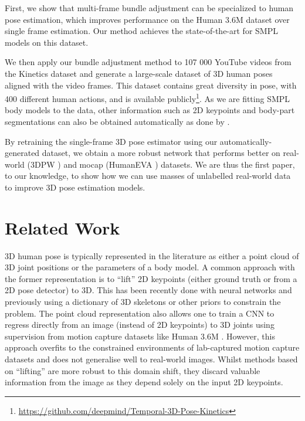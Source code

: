 \documentclass[10pt,twocolumn,letterpaper]{article}
\begin{document}
 
First, we show that multi-frame bundle adjustment can be specialized to
human pose estimation, which improves performance on the Human 3.6M dataset over single frame estimation. 
Our method achieves the state-of-the-art for SMPL \cite{loper_tog_2015} models on this dataset.

We then apply our bundle adjustment method to 107 000 YouTube videos from the Kinetics dataset \cite{kay_arxiv_2017} and generate a large-scale dataset of 3D human poses aligned with the video frames.
This dataset contains great diversity in pose, with 400 different human actions, 
and is available publicly\footnote{\url{https://github.com/deepmind/Temporal-3D-Pose-Kinetics}}.
As we are fitting SMPL body models \cite{loper_tog_2015} to the data, other information such as 2D keypoints and body-part segmentations can also be obtained automatically as done by \cite{lassner_cvpr_2017}.

By retraining the single-frame 3D pose estimator using our automatically-generated dataset, we obtain a more robust network that performs better on real-world (3DPW \cite{von_marcard_eccv_2018}) and mocap (HumanEVA \cite{sigal_nips_2008}) datasets.
We are thus the first paper, to our knowledge, to show how we can use masses of unlabelled real-world data to improve 3D pose estimation models.


 \section{Related Work}
3D human pose is typically represented in the literature as either a point cloud of 3D joint positions or the parameters of a body model.
A common approach with the former representation is to ``lift'' 2D keypoints (either ground truth or from a 2D pose detector) to 3D.
This has been recently done with neural networks \cite{martinez_iccv_2017, zhao_pami_2017, moreno_cvpr_2017} and previously using a dictionary of 3D skeletons \cite{ramakrishna_eccv_2012, akhter_cvpr_2015, zhou_cvpr_2016, wang_cvpr_2014} or other priors \cite{taylor_cviu_2000, valmadre_eccv_2010, akhter_cvpr_2015} to constrain the problem.
The point cloud representation also allows one to train a CNN to regress directly from an image (instead of 2D keypoints) to 3D joints using supervision from motion capture datasets like Human 3.6M \cite{pavlakos_cvpr_2017, sarandi_arxiv_2018, pavlakos_cvpr_2018b}.
However, this approach overfits to the constrained environments of lab-captured motion capture datasets and does not generalise well to real-world images.
Whilst methods based on ``lifting'' are more robust to this domain shift, they discard valuable information from the image as they depend solely on the input 2D keypoints.
\end{document}
